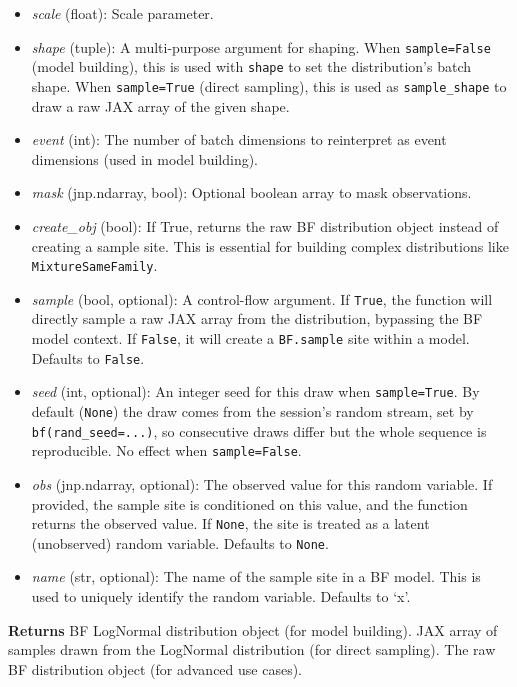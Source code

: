 \documentclass[
  letterpaper,
  DIV=11,
  numbers=noendperiod]{scrartcl}
\begin{document}
\begin{itemize}
\item
  \emph{scale} (float): Scale parameter.
\item
  \emph{shape} (tuple): A multi-purpose argument for shaping. When
  \texttt{sample=False} (model building), this is used with
  \texttt{shape} to set the distribution's batch shape. When
  \texttt{sample=True} (direct sampling), this is used as
  \texttt{sample\_shape} to draw a raw JAX array of the given shape.
\item
  \emph{event} (int): The number of batch dimensions to reinterpret as
  event dimensions (used in model building).
\item
  \emph{mask} (jnp.ndarray, bool): Optional boolean array to mask
  observations.
\item
  \emph{create\_obj} (bool): If True, returns the raw BF distribution
  object instead of creating a sample site. This is essential for
  building complex distributions like \texttt{MixtureSameFamily}.
\item
  \emph{sample} (bool, optional): A control-flow argument. If
  \texttt{True}, the function will directly sample a raw JAX array from
  the distribution, bypassing the BF model context. If \texttt{False},
  it will create a \texttt{BF.sample} site within a model. Defaults to
  \texttt{False}.
\item
  \emph{seed} (int, optional): An integer seed for this draw when
  \texttt{sample=True}. By default (\texttt{None}) the draw comes from
  the session's random stream, set by \texttt{bf(rand\_seed=...)}, so
  consecutive draws differ but the whole sequence is reproducible. No
  effect when \texttt{sample=False}.
\item
  \emph{obs} (jnp.ndarray, optional): The observed value for this random
  variable. If provided, the sample site is conditioned on this value,
  and the function returns the observed value. If \texttt{None}, the
  site is treated as a latent (unobserved) random variable. Defaults to
  \texttt{None}.
\item
  \emph{name} (str, optional): The name of the sample site in a BF
  model. This is used to uniquely identify the random variable. Defaults
  to `x'.
\end{itemize}

\textbf{Returns} BF LogNormal distribution object (for model building).
JAX array of samples drawn from the LogNormal distribution (for direct
sampling). The raw BF distribution object (for advanced use cases).
\end{document}
